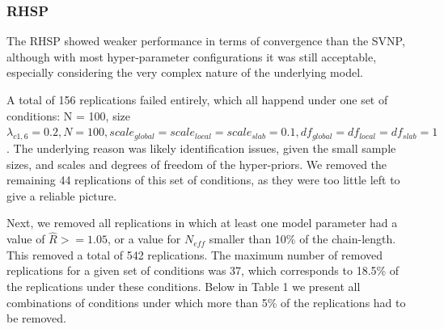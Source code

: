 \documentclass[
  man, donotrepeattitle,floatsintext]{apa6}
\begin{document}
\hypertarget{rhsp}{%
\subsubsection{RHSP}\label{rhsp}}

The RHSP showed weaker performance in terms of convergence than the SVNP, although with most hyper-parameter configurations it was still acceptable, especially considering the very complex nature of the underlying model.

A total of 156 replications failed entirely, which all happend under one set of conditions: N = 100, size \(\lambda_{c1,6} = 0.2, N = 100, scale_{global} = scale_{local} = scale_{slab} = 0.1, df_{global} = df_{local} = df_{slab} = 1\). The underlying reason was likely identification issues, given the small sample sizes, and scales and degrees of freedom of the hyper-priors. We removed the remaining 44 replications of this set of conditions, as they were too little left to give a reliable picture.

Next, we removed all replications in which at least one model parameter had a value of \(\hat{R} >= 1.05\), or a value for \(N_{eff}\) smaller than 10\% of the chain-length. This removed a total of 542 replications. The maximum number of removed replications for a given set of conditions was 37, which corresponds to 18.5\% of the replications under these conditions. Below in Table 1 we present all combinations of conditions under which more than 5\% of the replications had to be removed.
\end{document}
